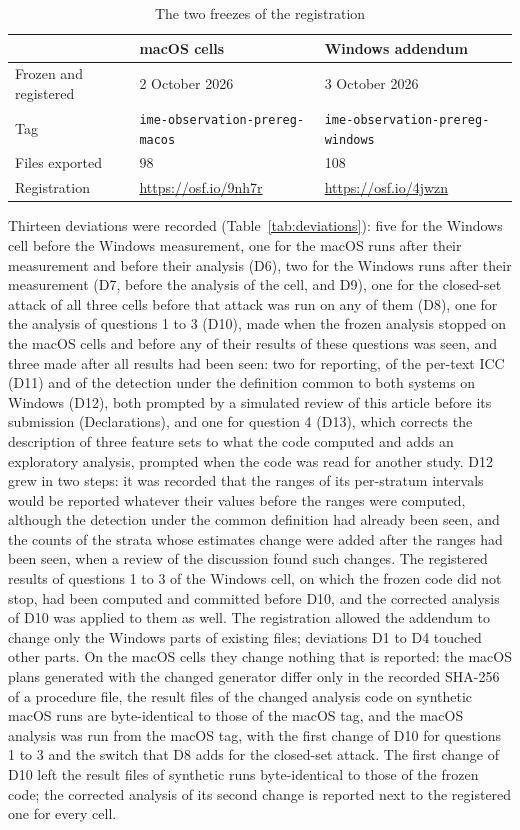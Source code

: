 \begin{table}[t]
\caption{The two freezes of the registration}
\label{tab:freezes}
\begin{tabular}{L{0.20}L{0.40}L{0.40}}
\toprule
& macOS cells & Windows addendum \\
\midrule
Frozen and registered & 2 October 2026 & 3 October 2026 \\
Tag & \texttt{ime-observation-prereg-macos} & \texttt{ime-observation-prereg-windows} \\
Files exported & 98 & 108 \\
Registration & \url{https://osf.io/9nh7r} & \url{https://osf.io/4jwzn} \\
\bottomrule
\end{tabular}
\end{table}

Thirteen deviations were recorded (Table~\ref{tab:deviations}): five for the Windows cell before the Windows
measurement, one for the macOS runs after their measurement and before their analysis (D6), two for the Windows runs
after their measurement (D7, before the analysis of the cell, and D9), one for the closed-set attack of all three
cells before that attack was run on any of them (D8), one for the analysis of questions 1 to 3 (D10), made when the
frozen analysis stopped on the macOS cells and before any of their results of these questions was seen, and three made
after all results had been seen: two for reporting, of the per-text ICC (D11) and of the detection under the
definition common to both systems on Windows (D12), both prompted by a simulated review of this article before its
submission (Declarations), and one for question 4 (D13), which corrects the description of three feature sets to what
the code computed and adds an exploratory analysis, prompted when the code was read for another study. D12 grew in two steps: it was recorded that the ranges of its per-stratum intervals would be reported
whatever their values before the ranges were computed, although the detection under the common definition had already
been seen, and the counts of the strata whose estimates change were added after the ranges had been seen, when a review
of the discussion found such changes. The registered results of questions 1 to 3
of the Windows cell, on which the frozen code did not stop, had been computed and committed before D10, and the
corrected analysis of D10 was applied to them as well. The
registration allowed the addendum to change only the Windows parts of existing files; deviations D1 to D4 touched
other parts. On the macOS cells they change nothing that is reported: the macOS plans generated with the changed
generator differ only in the recorded SHA-256 of a procedure file, the result files of the changed analysis code on
synthetic macOS runs are byte-identical to those of the macOS tag, and the macOS analysis was run from the macOS tag,
with the first change of D10 for questions 1 to 3 and the switch that D8 adds for the closed-set attack. The first
change of D10 left the result files of synthetic runs byte-identical to those of the frozen code; the corrected
analysis of its second change is reported next to the registered one for every cell.

